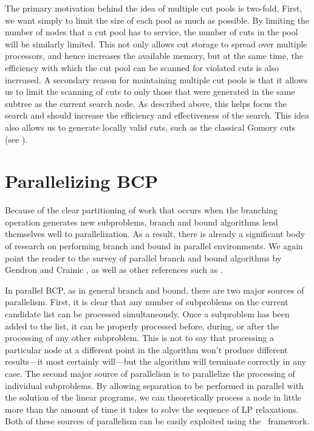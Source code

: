 The primary motivation behind the idea of multiple cut pools is
two-fold. First, we want simply to limit the size of each pool as
much as possible. By limiting the number of nodes that a cut pool has
to service, the number of cuts in the pool will be similarly limited.
This not only allows cut storage to spread over multiple processors,
and hence increases the available memory, but at the same time, the
efficiency with which the cut pool can be scanned for violated cuts is
also increased. A secondary reason for maintaining multiple cut pools is
that it allows us to limit the scanning of cuts to only those that
were generated in the same subtree as the current search node. As
described above, this helps focus the search and should increase the
efficiency and effectiveness of the search. This idea also
allows us to generate locally valid cuts, such as the classical
Gomory cuts (see \cite{N&W}).

\section{Parallelizing BCP}
\label{parallelizing}

Because of the clear partitioning of work that occurs when the
branching operation generates new subproblems, branch and bound
algorithms lend themselves well to parallelization. As a result, there
is already a significant body of research on performing branch and
bound in parallel environments. We again point the reader to the
survey of parallel branch and bound algorithms by Gendron and Crainic
\cite{G&C}, as well as other references such as \cite{PICO, G&K, R&K, K&R}.

In parallel BCP, as in general branch and bound, there are two major
sources of parallelism. First, it is clear that any number of
subproblems on the current candidate list can be processed
simultaneously. Once a subproblem has been added to the list, it can
be properly processed before, during, or after the processing of any
other subproblem. This is not to say that processing a particular node
at a different point in the algorithm won't produce different
results---it most certainly will---but the algorithm will terminate
correctly in any case. The second major source of parallelism is to
parallelize the processing of individual subproblems. By allowing
separation to be performed in parallel with the solution of the linear
programs, we can theoretically process a node in little more than the
amount of time it takes to solve the sequence of LP relaxations. Both
of these sources of parallelism can be easily exploited using the
\BB\ framework.

